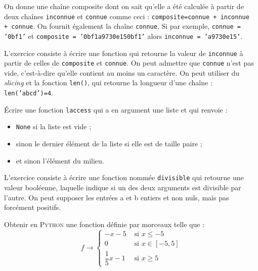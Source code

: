 \begin{exercise}[title={Séquences et longueur}, level=intermediate]
On donne une chaîne composite dont on sait qu'elle a été calculée à partir de deux chaînes \texttt{inconnue} et \texttt{connue} comme ceci : \texttt{composite=connue\,+\,inconnue\,+\,connue}.
On fournit également la chaîne \texttt{connue}. Si par exemple, \texttt{connue = '0bf1'} et \texttt{composite = '0bf1a9730e150bf1'} alors \texttt{inconnue = 'a9730e15'}.

L'exercice consiste à écrire une fonction qui retourne la valeur de \texttt{inconnue} à partir de celles de \texttt{composite} et \texttt{connue}. On peut admettre que \texttt{connue} n'est pas vide, c'est-à-dire qu'elle contient au moins un caractère.
On peut utiliser du \textit{slicing} et la fonction \texttt{len()}, qui retourne la longueur d'une chaîne : \texttt{len('abcd')=4}.
\end{exercise}

\begin{exercise}[title={Listes}, level=basic]
Écrire une fonction \texttt{laccess} qui a en argument une liste et qui renvoie :
\begin{itemize}
\item \texttt{None} si la liste est vide ;
\item sinon le dernier élément de la liste si elle est de taille paire ;
\item et sinon l'élément du milieu.
\vspace{-.25\baselineskip}
\end{itemize}
\end{exercise}

\begin{exercise}[title={Fonction de divisibilité}, level=basic]
L'exercice consiste à écrire une fonction nommée \texttt{divisible} qui retourne une valeur booléenne, laquelle indique si un des deux arguments est divisible par l'autre.
On peut supposer les entrées a et b entiers et non nuls, mais pas forcément positifs.
\vspace{-.25\baselineskip}
\end{exercise}

\begin{exercise}[title={Fonction définie par morceaux}, level=basic]
Obtenir en \textsc{Python} une fonction définie par morceaux telle que :
\begin{equation*}
  f \longrightarrow \left\{
  \begin{array}{ll}
  -x - 5 & \mbox{~si~} x \leq -5 \\
  0 & \mbox{~si~} x \in [-5,5] \\
  \dfrac{1}{5}x -1 & \mbox{~si~} x \geq 5
  \end{array}
  \right.
\end{equation*}
\vspace{-\baselineskip}
\end{exercise}

